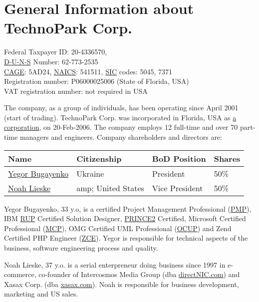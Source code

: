 
\section*{General Information about TechnoPark Corp.}

Federal Taxpayer ID: 20-4336570, \\
\href{https://smallbusiness.dnb.com}{D-U-N-S} Number: 62-773-2535 \\
\href{http://www.dlis.dla.mil/cage_welcome.asp}{CAGE}: 5AD24, 
	\href{http://www.census.gov/eos/www/naics/}{NAICS}: 541511, 
	\href{http://www.osha.gov/pls/imis/sicsearch.html}{SIC} codes: 5045, 7371 \\
Registration number: P06000025006 (State of Florida, USA) \\
VAT registration number: not required in USA

The company, as a group of individuals, has been operating since April 2001 (start of trading). 
TechnoPark Corp. was incorporated in Florida, USA as 
\href{http://en.wikipedia.org/wiki/Corporation}{a corporation}, on 20-Feb-2006.
The company employs 12 full-time and over 70 part-time managers and engineers.
Company shareholders and directors are:

\begin{tabular}{llll}
Name & 		Citizenship & 	BoD Position & 	Shares \\
\hline
\href{mailto:egor@technoparkcorp.com}{Yegor Bugayenko}	& 	Ukraine &		President & 	50\% \\
\href{mailto:noah@technoparkcorp.com}{Noah Lieske} &amp;	United States & 	Vice President & 	50\% \\
\end{tabular}

Yegor Bugayenko, 33 y.o, is a certified 
Project Management Professional (\href{http://en.wikipedia.org/wiki/Project_Management_Professional}{PMP}), 
IBM \href{http://www-03.ibm.com/certify/certs/38008003.shtml}{RUP} Certified Solution Designer, 
\href{http://www.prince2.com/}{PRINCE2} Certified,
Microsoft Certified Professional (\href{http://www.microsoft.com/learning/mcp/mcp/}{MCP}), 
OMG Certified UML Professional (\href{http://www.omg.org/uml-certification/}{OCUP}) and 
Zend Certified PHP Engineer (\href{http://www.zend.com/en/services/certification/}{ZCE}).
Yegor is responsible for technical aspects of the business, software engineering process
and quality.

Noah Lieske, 37 y.o.
is a serial enterpreneur doing business since 1997 in 
e-commerce, co-founder of Intercosmos Media Group (dba \href{http://www.directnic.com}{directNIC.com}) and 
Xasax Corp. (dba \href{http://www.xasax.com}{xasax.com}). Noah is responsible
for business development, marketing and US sales.

